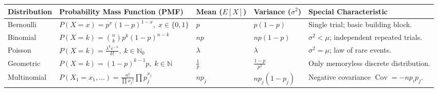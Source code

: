 \documentclass[12pt,a4paper]{article}
\renewcommand{\arraystretch}{1.45}
\begin{document}
\vspace{2pt}

\begin{tcolorbox}[tikzbox, title={\textbf{Summary Matrix: Comprehensive Comparison of Discrete Probability Distributions}}]
\par\vspace{1pt}
\begingroup
\setlength{\tabcolsep}{3.5pt}
\setlength{\extrarowheight}{1.0pt}
\renewcommand{\arraystretch}{1.12}
\noindent\begin{tabularx}{\linewidth}{|B{2.5cm}|B{3.8cm}|B{2.2cm}|B{2.2cm}|Y|}
\hline
\textbf{Distribution} & \textbf{Probability Mass Function (PMF)} & \textbf{Mean ($E[X]$)} & \textbf{Variance ($\sigma^2$)} & \textbf{Special Characteristic} \\
\hline
Bernoulli & $P(X=x) = p^x (1-p)^{1-x}, \; x \in \{0, 1\}$ & $p$ & $p(1-p)$ & Single trial; basic building block. \\
\hline
Binomial & $P(X=k) = \binom{n}{k} p^k (1-p)^{n-k}$ & $np$ & $np(1-p)$ & $\sigma^2 < \mu$; independent repeated trials. \\
\hline
Poisson & $P(X=k) = \frac{\lambda^k e^{-\lambda}}{k!}, \; k \in \mathbb{N}_0$ & $\lambda$ & $\lambda$ & $\sigma^2 = \mu$; law of rare events. \\
\hline
Geometric & $P(X=k) = (1-p)^{k-1} p, \; k \in \mathbb{N}$ & $\frac{1}{p}$ & $\frac{1-p}{p^2}$ & Only memoryless discrete distribution. \\
\hline
Multinomial & $P(X_1=x_1,\dots) = \frac{n!}{\prod x_j!} \prod p_j^{x_j}$ & $n p_j$ & $n p_j (1 - p_j)$ & Negative covariance $\operatorname{Cov} = -n p_i p_j$. \\
\hline
\end{tabularx}\par
\endgroup
\end{tcolorbox}
\end{document}
